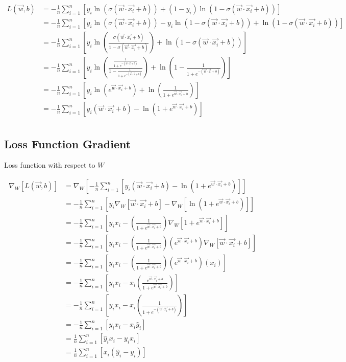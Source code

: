 \documentclass[openany]{book}
\begin{document}
\begin{align*}
L(\vec{w}, b) &= -\frac{1}{n}  \sum_{i=1}^{n}[ y_i \ln(\sigma{(\vec{w} \cdot \vec{x_i} + b)}) + (1-y_i) \ln(1 - \sigma{(\vec{w} \cdot \vec{x_i} + b)})] \\ 
&= -\frac{1}{n}  \sum_{i=1}^{n}[ y_i \ln(\sigma{(\vec{w} \cdot \vec{x_i} + b)}) - y_i \ln(1 - \sigma{(\vec{w} \cdot \vec{x_i} + b)}) + \ln(1 - \sigma{(\vec{w} \cdot \vec{x_i} + b)})] \\ 
&= -\frac{1}{n}  \sum_{i=1}^{n}[ y_i \ln(\frac{\sigma{(\vec{w} \cdot \vec{x_i} + b)}}{1 - \sigma{(\vec{w} \cdot \vec{x_i} + b)}}) + \ln(1 - \sigma{(\vec{w} \cdot \vec{x_i} + b)})] \\
&= -\frac{1}{n}  \sum_{i=1}^{n}[ y_i \ln(\frac{\frac{1}{1+e^{-(\vec{w} \cdot \vec{x} + b)}}}{1 - \frac{1}{1+e^{-(\vec{w} \cdot \vec{x} + b)}}}) + \ln(1 - \frac{1}{1+e^{-(\vec{w} \cdot \vec{x} + b)}})] \\
&= -\frac{1}{n} \sum_{i=1}^{n} [y_i \ln(e^{\vec{w} \cdot \vec{x_i} + b}) + \ln(\frac{1}{1+e^{\vec{w} \cdot \vec{x_i} + b}})] \\ 
&= -\frac{1}{n} \sum_{i=1}^{n} [y_i (\vec{w} \cdot \vec{x_i} + b) - \ln(1+e^{\vec{w} \cdot \vec{x_i} + b})] \\ 
\end{align*}

    \subsection{Loss Function Gradient}\label{loss-function-gradient}

    Loss function with respect to \(W\)

\begin{align*}
\nabla_{W} [L(\vec{w}, b)] &= \nabla_{W} [-\frac{1}{n} \sum_{i=1}^{n} [y_i (\vec{w} \cdot \vec{x_i} + b) - \ln(1+e^{\vec{w} \cdot \vec{x_i} + b})]] \\
&= -\frac{1}{n} \sum_{i=1}^{n} [y_i \nabla_{W} [\vec{w} \cdot \vec{x_i} + b] - \nabla_{W}[\ln(1+e^{\vec{w} \cdot \vec{x_i} + b})]] \\
&= -\frac{1}{n} \sum_{i=1}^{n} [y_i x_i - (\frac{1}{1+e^{\vec{w} \cdot \vec{x_i} + b}}) \nabla_{W}[1+e^{\vec{w} \cdot \vec{x_i} + b}]] \\
&= -\frac{1}{n} \sum_{i=1}^{n} [y_i x_i - (\frac{1}{1+e^{\vec{w} \cdot \vec{x_i} + b}}) (e^{\vec{w} \cdot \vec{x_i} + b})\nabla_{W}[\vec{w} \cdot \vec{x_i} + b]] \\
&= -\frac{1}{n} \sum_{i=1}^{n} [y_i x_i - (\frac{1}{1+e^{\vec{w} \cdot \vec{x_i} + b}}) (e^{\vec{w} \cdot \vec{x_i} + b})(x_i)] \\
&= -\frac{1}{n} \sum_{i=1}^{n} [y_i x_i - x_i(\frac{e^{\vec{w} \cdot \vec{x_i} + b}}{1+e^{\vec{w} \cdot \vec{x_i} + b}})] \\
&= -\frac{1}{n} \sum_{i=1}^{n} [y_i x_i - x_i(\frac{1}{1+e^{-(\vec{w} \cdot \vec{x_i} + b)}})] \\ 
&= -\frac{1}{n} \sum_{i=1}^{n} [y_i x_i - x_i\hat y_i] \\ 
&= \frac{1}{n} \sum_{i=1}^{n} [\hat y_i x_i - y_i x_i  ] \\ 
&= \frac{1}{n} \sum_{i=1}^{n} [x_i (\hat y_i - y_i)] \\
\end{align*}
\end{document}
